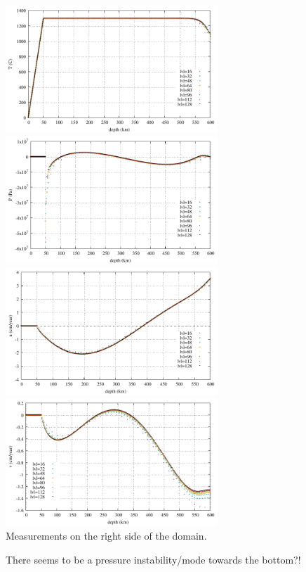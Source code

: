 \begin{center}
\includegraphics[width=8cm]{python_codes/fieldstone_149/results/case1c/rightT.pdf}
\includegraphics[width=8cm]{python_codes/fieldstone_149/results/case1c/rightP.pdf}\\
\includegraphics[width=8cm]{python_codes/fieldstone_149/results/case1c/rightu.pdf}
\includegraphics[width=8cm]{python_codes/fieldstone_149/results/case1c/rightv.pdf}\\
{\captionfont Measurements on the right side of the domain.}
\end{center}

There seems to be a pressure instability/mode towards the bottom?!












